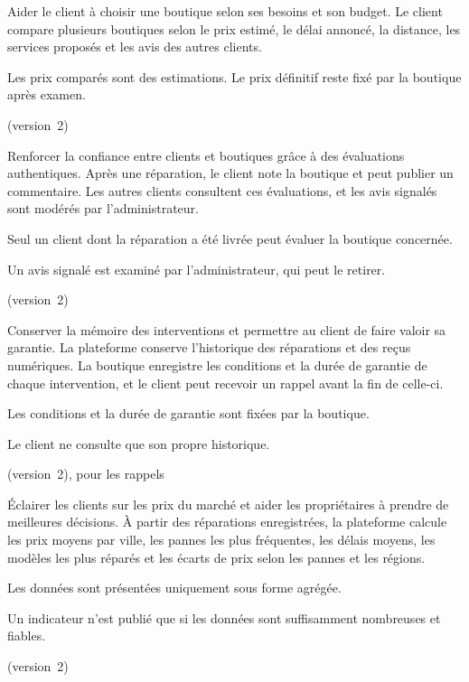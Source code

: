   {Aider le client à choisir une boutique selon ses besoins et son budget.}
  {Le client compare plusieurs boutiques selon le prix estimé, le délai annoncé, la distance, les services proposés et les avis des autres clients.}
  {\begin{cdccellitems}
    \item Les prix comparés sont des estimations. Le prix définitif reste fixé par la boutique après examen.
  \end{cdccellitems}}
  {\prioShould{} (version~2)}

  {Renforcer la confiance entre clients et boutiques grâce à des évaluations authentiques.}
  {Après une réparation, le client note la boutique et peut publier un commentaire. Les autres clients consultent ces évaluations, et les avis signalés sont modérés par l’administrateur.}
  {\begin{cdccellitems}
    \item Seul un client dont la réparation a été livrée peut évaluer la boutique concernée.
    \item Un avis signalé est examiné par l’administrateur, qui peut le retirer.
  \end{cdccellitems}}
  {\prioShould{} (version~2)}

  {Conserver la mémoire des interventions et permettre au client de faire valoir sa garantie.}
  {La plateforme conserve l’historique des réparations et des reçus numériques. La boutique enregistre les conditions et la durée de garantie de chaque intervention, et le client peut recevoir un rappel avant la fin de celle-ci.}
  {\begin{cdccellitems}
    \item Les conditions et la durée de garantie sont fixées par la boutique.
    \item Le client ne consulte que son propre historique.
  \end{cdccellitems}}
  {\prioShould{} (version~2), \prioCould{} pour les rappels}

  {Éclairer les clients sur les prix du marché et aider les propriétaires à prendre de meilleures décisions.}
  {À partir des réparations enregistrées, la plateforme calcule les prix moyens par ville, les pannes les plus fréquentes, les délais moyens, les modèles les plus réparés et les écarts de prix selon les pannes et les régions.}
  {\begin{cdccellitems}
    \item Les données sont présentées uniquement sous forme agrégée.
    \item Un indicateur n’est publié que si les données sont suffisamment nombreuses et fiables.
  \end{cdccellitems}}
  {\prioShould{} (version~2)}

